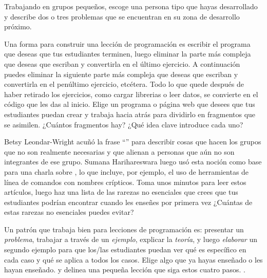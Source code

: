 Trabajando en grupos pequeños,
escoge una persona tipo que hayas desarrollado
y describe dos o tres problemas que se encuentran en su zona de desarrollo próximo.
 
 
Una forma para construir una lección de programación
es escribir el programa que deseas que tus estudiantes terminen,
luego eliminar la parte más compleja que deseas que escriban
y convertirla en el último ejercicio.
A continuación puedes eliminar la siguiente parte más compleja que deseas que escriban
y convertirla en el penúltimo ejercicio, etcétera.
Todo lo que quede después de haber retirado los ejercicios,
como cargar librerias o leer datos,
se convierte en el código que les das al inicio.
 Elige un programa o página web que desees que
tus estudiantes puedan crear
y trabaja hacia atrás para dividirlo en fragmentos que se asimilen.
¿Cuántos fragmentos hay?
¿Qué idea clave introduce cada uno?
 
 
Betsy Leondar-Wright acuñó la frase
``''
para describir cosas que hacen los grupos
que no son realmente necesarias y
que alienan a personas que aún no son integrantes de ese grupo.
Sumana Harihareswara luego usó esta noción
como base para una charla sobre
,
lo que incluye, por ejemplo, el uso de herramientas de línea de comandos con nombres crípticos.
Toma unos minutos para leer estos artículos,
luego haz una lista de las rarezas no esenciales que crees
que tus estudiantes podrían encontrar
cuando les enseñes por primera vez
¿Cuántas de estas rarezas no esenciales puedes evitar?
 

Un patrón que trabaja bien para lecciones de programación es:
presentar un \emph{problema},
trabajar a través de un \emph{ejemplo},
explicar la \emph{teoría},
y luego \emph{elaborar} un segundo ejemplo
para que los/las estudiantes puedan ver qué es específico en cada caso
y qué se aplica a todos los casos.
Elige algo que ya hayas enseñado o les hayan enseñado.
y delinea una pequeña lección que siga estos cuatro pasos.
.

